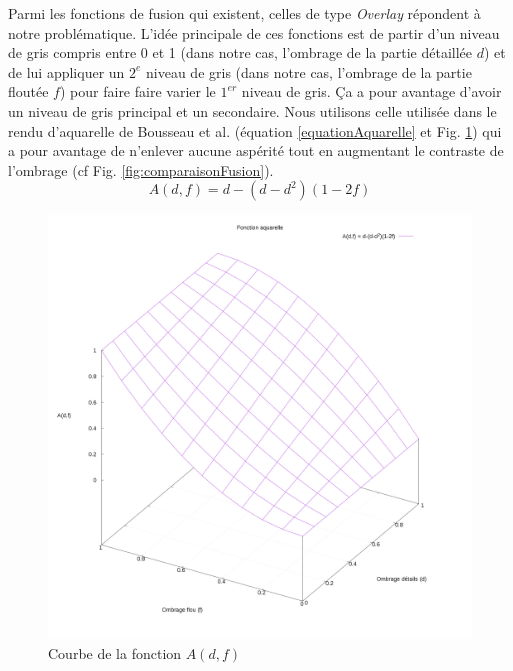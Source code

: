 Parmi les fonctions de fusion qui existent, celles de type \textit{Overlay} répondent à notre problématique. L'idée principale de ces fonctions est de partir d'un niveau de gris compris entre 0 et 1 (dans notre cas, l'ombrage de la partie détaillée $d$) et de lui appliquer un $2^e$ niveau de gris (dans notre cas, l'ombrage de la partie floutée $f$) pour faire faire varier le $1^{er}$ niveau de gris. Ça a pour avantage d'avoir un niveau de gris principal et un secondaire. Nous utilisons celle utilisée dans le rendu d'aquarelle de Bousseau et al. \cite{bousseau2006interactive} (équation  \ref{equationAquarelle} et Fig. \ref{fig:watercolorcurve}) qui a pour avantage de n'enlever aucune aspérité tout en augmentant le contraste de l'ombrage (cf Fig. \ref{fig:comparaisonFusion}).
\begin{equation}
\label{equationAquarelle}
        A(d,f) = d - (d -d^2)( 1-2f) 
\end{equation}
\begin{figure}[h!]
\centering
        \includegraphics[width=0.5\linewidth]{Solution/watercolor_curve}
        \caption{\label{fig:watercolorcurve} Courbe de la fonction $A(d,f)$}

\end{figure}

